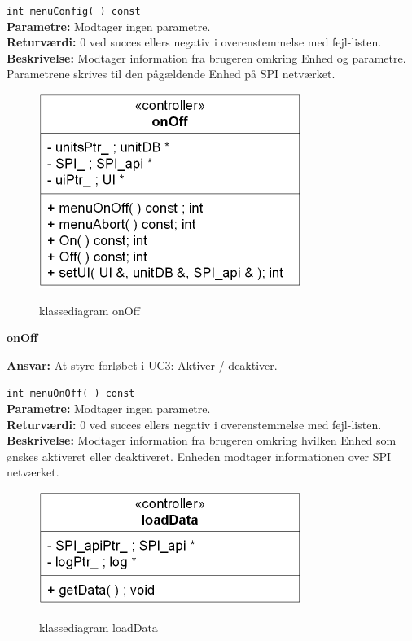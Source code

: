 \verb+int menuConfig( ) const+ \\
\textbf{Parametre:} Modtager ingen parametre. \\
\textbf{Returværdi:} 0 ved succes ellers negativ i overenstemmelse med fejl-listen. \\
\textbf{Beskrivelse:} Modtager information fra brugeren omkring Enhed og parametre. Parametrene skrives til den pågældende Enhed på SPI netværket.\\

\begin{figure}[htbp] \centering
{\includegraphics[scale=1.5]{filer/design/Klassediagrammer/sw_onOff}}
\caption{klassediagram onOff}
\label{fig:onOff klassediagram}
\end{figure} 

\newpage

{\centering
\textbf{onOff}\par
}
\textbf{Ansvar:} At styre forløbet i UC3: Aktiver / deaktiver. \

\verb+int menuOnOff( ) const+ \\
\textbf{Parametre:} Modtager ingen parametre. \\
\textbf{Returværdi:} 0 ved succes ellers negativ i overenstemmelse med fejl-listen. \\
\textbf{Beskrivelse:} Modtager information fra brugeren omkring hvilken Enhed som ønskes aktiveret eller deaktiveret. Enheden modtager informationen over SPI netværket.\\

\begin{figure}[htbp] \centering
{\includegraphics[scale=1.5]{filer/design/Klassediagrammer/sw_loadData}}
\caption{klassediagram loadData}
\label{fig:loadData klassediagram}
\end{figure} 

